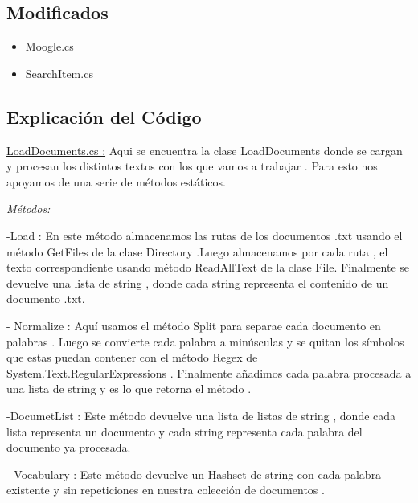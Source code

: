 \documentclass{article}
\begin{document}
\begin{center}
\begin{itemize}
		\end{itemize}
		
	
		\subsection{Modificados}
		\begin{itemize}
			\item Moogle.cs			  
			\item SearchItem.cs
		\end{itemize}
		
	\vspace{1em}
	\begin{flushleft}
		
	
	\section{Explicación del Código}	
	
	\underline{LoadDocuments.cs :} 	
		Aqui se encuentra la clase LoadDocuments donde se cargan y procesan los distintos textos con los que vamos a trabajar . Para esto nos apoyamos de una serie de métodos estáticos.\vspace{2em}
		
		\textit{ \large {Métodos:}} 
		
		
		
		
		\vspace{1em}-Load :
		En este método almacenamos las rutas de los documentos .txt usando el método GetFiles de la clase Directory .Luego almacenamos por cada ruta ,  el texto correspondiente usando método ReadAllText de la clase File. Finalmente se devuelve una lista de string , donde cada string representa el contenido de un documento .txt.\vspace{0.5em} 
		
		- Normalize :
		Aquí usamos el método Split para separae cada documento en palabras . Luego se convierte cada palabra a minúsculas y se quitan los símbolos que estas puedan contener con el método Regex de System.Text.RegularExpressions . Finalmente añadimos cada palabra procesada a una lista de string y es lo que retorna el método .\vspace{0.5em}
		
		-DocumetList :
		Este método devuelve una lista de listas de string , donde cada lista representa un documento y cada string representa cada palabra del documento ya procesada.\vspace{0.5em}
		
		- Vocabulary :
		Este método devuelve un Hashset de string con cada palabra existente y sin repeticiones en nuestra colección de documentos . \vspace{0.5em}
		

\end{flushleft}
\end{center}
\end{document}
